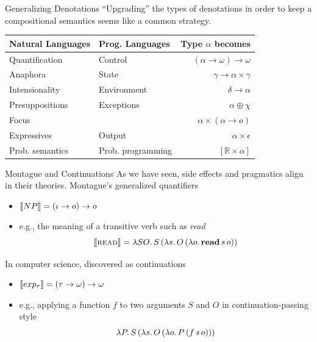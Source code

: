 \documentclass{beamer}
\begin{document}
\begin{frame}{Generalizing Denotations}
  ``Upgrading'' the types of denotations in order to keep a compositional
  semantics seems like a common strategy.
  \vfill
  \begin{tabular}{llr}
    Natural Languages & Prog. Languages & Type $\alpha$ becomes \\
    \hline
    Quantification & Control &
    $(\alpha \to \omega) \to \omega$ \\
    Anaphora & State &
    $\gamma \to \alpha \times \gamma$ \\
    Intensionality & Environment &
    $\delta \to \alpha$ \\
    Presuppositions & Exceptions &
    $\alpha \oplus \chi$ \\
    Focus & &
    $\alpha \times (\alpha \to o)$ \\
    Expressives & Output &
    $\alpha \times \epsilon$ \\
    Prob. semantics & Prob. programming &
    $[\mathbb{R} \times \alpha]$ \\
  \end{tabular}
\end{frame}


\begin{frame}{Montague and Continuations}
  As we have seen, side effects and pragmatics align in their theories.
  \pause
  \vfill
  Montague's generalized quantifiers
  \begin{itemize}
  \item $\llbracket NP \rrbracket = (\iota \to o) \to o$
  \item e.g., the meaning of a transitive verb such as \textit{read}
    $$ \llbracket \textsc{read} \rrbracket = \lambda S O.\, S\,(\lambda s.\, O\,(\lambda o.\, \textbf{read}\,s\,o)) $$
  \end{itemize}
  \vfill
  \pause
  In computer science, discovered as continuations
  \begin{itemize}
  \item $\llbracket exp_{\tau} \rrbracket = (\tau \to \omega) \to \omega$
  \item e.g., applying a function $f$ to two arguments $S$ and $O$ in
    continuation-passing style
    $$\lambda P.\, S\,(\lambda s.\, O\,(\lambda o.\, P\,(f\,s\,o)))$$
  \end{itemize}
\end{frame}
\end{document}
